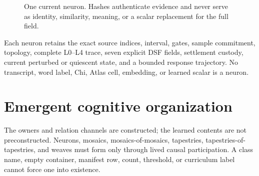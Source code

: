 \documentclass[11pt]{article}
\begin{document}
\begin{figure}[h]
\centering
{}
\caption{One current neuron.  Hashes authenticate evidence and never serve as
identity, similarity, meaning, or a scalar replacement for the full field.}
\end{figure}

Each neuron retains the exact source indices, interval, gates, sample
commitment, topology, complete L0--L4 trace, seven explicit DSF fields,
settlement custody, current perturbed or quiescent state, and a bounded
response trajectory.  No transcript, word label, Chi, Atlas cell, embedding,
or learned scalar is a neuron.

\section{Emergent cognitive organization}

The owners and relation channels are constructed; the learned contents are
not preconstructed.  Neurons, mosaics, mosaics-of-mosaics, tapestries,
tapestries-of-tapestries, and weaves must form only through lived causal
participation.  A class name, empty container, manifest row, count, threshold,
or curriculum label cannot force one into existence.
\end{document}
